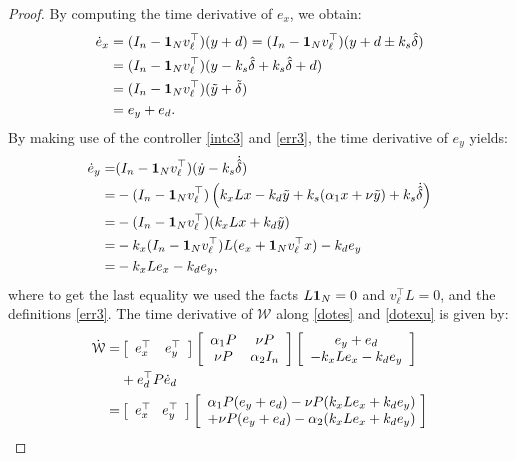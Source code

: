 \documentclass[journal,twoside]{IEEEtran}
\begin{document}
\begin{proof}
By computing the time derivative of $e_x$, we obtain:
\begin{align}
 \dot e_x=& \; (I_n-{\bf 1}_N v_\ell^\top)(y+d)= (I_n-{\bf 1}_N v_\ell^\top) (y+d \pm k_s \hat \delta )  \nonumber  \\
  =& \;  (I_n-{\bf 1}_N v_\ell^\top) (y -  k_s \hat \delta + k_s \hat \delta + d )  \nonumber \\
  =& \;  (I_n-{\bf 1}_N v_\ell^\top) (\tilde y  + \tilde  \delta )  \nonumber \\
  =& \; e_y + e_d.   
  \label{dotexu}
  \end{align}
  By making use of the controller \eqref{intc3} and \eqref{err3}, the time derivative of $e_y$ yields:
  \begin{align}
   \dot e_y=& (I_n-{\bf 1}_N v_\ell^\top) (\dot y - k_s \dot {\hat \delta})\nonumber \\
   =& -(I_n-{\bf 1}_N v_\ell^\top)   \left( k_x L  x  -  k_d \tilde y  +  k_s ( \alpha_1 x + \nu \tilde y) + k_s \dot{\hat \delta} \right) \nonumber \\
=& - (I_n-{\bf 1}_N v_\ell^\top) (k_x L x +k_d \tilde y )   \nonumber \\
 =& -k_x (I_n-{\bf 1}_N v_\ell^\top)L(e_x+{\bf 1}_Nv_\ell^\top x) -k_d e_y  \nonumber \\
 =& -k_x L e_x -k_de_y, 
 \label{dotes}
\end{align}
 where to get the last equality we used the facts   $L {\bf 1}_N=0$ and $v^\top_\ell L=0$, and the definitions \eqref{err3}. 
 The time derivative of  ${\mathcal W}$ along  \eqref{dotes} and \eqref{dotexu} is given by:
 \begin{align}
 \dot{\mathcal W}=& \left[ \begin{array}{cc} e_x^\top  & e_y^\top  \end{array} \right]\left[ \begin{array}{cc} \alpha_1 P &  \nu P \\ \nu P & \alpha_2 I_n \end{array} \right]   \left[ \begin{array}{c} e_y+ e_d \\ -k_x Le_x -k_d e_y  \end{array} \right]   \nonumber \\
 & +e_d^\top P \dot e_d \nonumber \\
 =& \left[ \begin{array}{cc} e_x^\top  & \hspace{-.7mm} e_y^\top  \end{array} \right]    \left[ \begin{array}{c} \alpha_1 P(e_y+ e_d) - \nu P (k_x Le_x +k_d e_y)  \\ +\nu P(e_y+ e_d)  -\alpha_2(k_x Le_x +k_d e_y)  \end{array}  \hspace{-.6mm} \right]   \nonumber \\

\end{align}
\end{proof}
\end{document}
